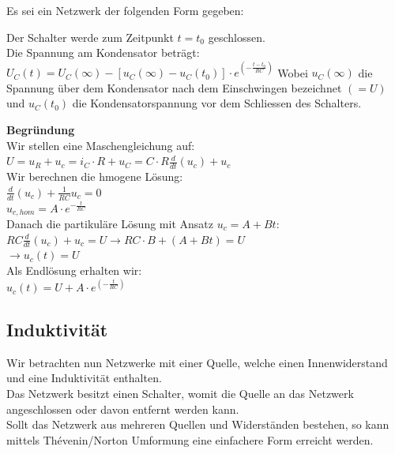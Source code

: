 \beginip
	Es sei ein Netzwerk der folgenden Form gegeben:
	\begin{center}
	\end{center}
	Der Schalter werde zum Zeitpunkt $t = t_0$ geschlossen. \\
	Die Spannung am Kondensator beträgt: \\
	\formulaBegin
	$\displaystyle U_C(t) = U_C(\infty) - [u_C(\infty) - u_C(t_0)] \cdot e^{(-\frac{t -t_0}{RC})}$
	\formulaEnd
	Wobei $u_C(\infty)$ die Spannung über dem Kondensator nach dem Einschwingen bezeichnet $(= U)$ und $u_C(t_0)$ die Kondensatorspannung vor dem Schliessen des Schalters.
\iend

\textbf{Begründung} \\
Wir stellen eine Maschengleichung auf: \\
$\displaystyle U = u_R + u_c = i_C \cdot R + u_C = C \cdot R \frac{d}{dt}(u_c) + u_c$ \\
Wir berechnen die hmogene Lösung:  \\
$ \frac{d}{dt}(u_c) + \frac{1}{RC} u_c = 0$ \\
$ u_{c,hom} = A\cdot e^{-\frac{t}{RC}}$ \\
Danach die partikuläre Lösung mit Ansatz $u_c = A + Bt$: \\
$ RC \frac{d}{dt}(u_c) + u_c = U \rightarrow RC \cdot B  + ( A + Bt) = U $ \\
$ \rightarrow u_c(t) = U$ \\
Als Endlösung erhalten wir: \\
$\displaystyle u_c(t) = U + A \cdot  e^{(-\frac{t}{RC})}$

\subsection{Induktivität}
Wir betrachten nun Netzwerke mit einer Quelle, welche einen Innenwiderstand und eine Induktivität enthalten. \\
Das Netzwerk besitzt einen Schalter, womit die Quelle an das Netzwerk angeschlossen oder davon entfernt werden kann. \\
Sollt das Netzwerk aus mehreren Quellen und Widerständen bestehen, so kann mittels Thévenin/Norton Umformung eine einfachere Form erreicht werden.

